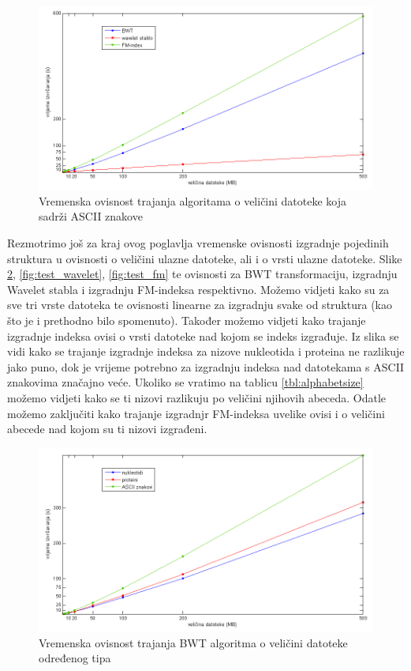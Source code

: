 \begin{figure}[h]
   \centering
       \includegraphics[width=\textwidth]{./pictures/test_ascii.png}
 \caption{Vremenska ovisnost trajanja algoritama o veličini datoteke koja sadrži ASCII znakove}
 \label{fig:test_ascii}
\end{figure}


Rezmotrimo još za kraj ovog poglavlja vremenske ovisnosti izgradnje pojedinih struktura u ovisnosti o veličini ulazne datoteke, ali i o vrsti ulazne datoteke. Slike \ref{fig:test_bwt}, \ref{fig:test_wavelet}, \ref{fig:test_fm} te ovisnosti za BWT transformaciju, izgradnju Wavelet stabla i izgradnju FM-indeksa respektivno. Možemo vidjeti kako su za sve tri vrste datoteka te ovisnosti linearne za izgradnju svake od struktura (kao što je i prethodno bilo spomenuto). Također možemo vidjeti kako trajanje izgradnje indeksa ovisi o vrsti datoteke nad kojom se indeks izgrađuje. Iz slika se vidi kako se trajanje izgradnje indeksa za nizove nukleotida i proteina ne razlikuje jako puno, dok je vrijeme potrebno za izgradnju indeksa nad datotekama s ASCII znakovima značajno veće. Ukoliko se vratimo na tablicu \ref{tbl:alphabetsize} možemo vidjeti kako se ti nizovi razlikuju po veličini njihovih abeceda. Odatle možemo zaključiti kako trajanje izgradnjr FM-indeksa uvelike ovisi i o veličini abecede nad kojom su ti nizovi izgrađeni.


\begin{figure}[H]
   \centering
       \includegraphics[width=\textwidth]{./pictures/test_bwt.png}
 \caption{Vremenska ovisnost trajanja BWT algoritma o veličini datoteke određenog tipa}
 \label{fig:test_bwt}
\end{figure}


